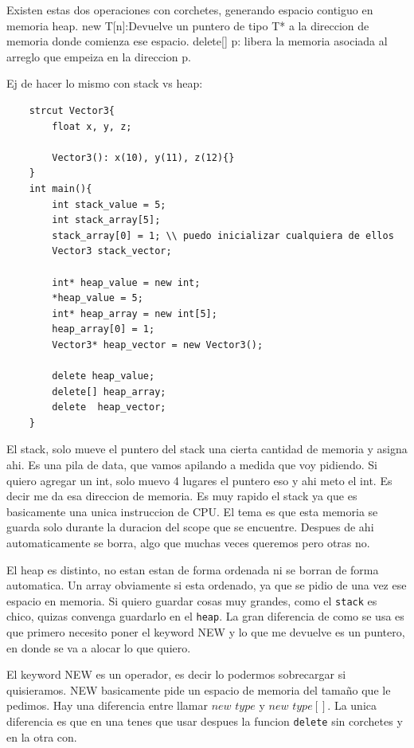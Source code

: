 \documentclass[11pt]{article}
\begin{document}
Existen estas dos operaciones con corchetes, generando espacio contiguo en memoria heap.
new T[n]:Devuelve un puntero de tipo T* a la direccion de memoria donde comienza ese espacio.
delete[] p: libera la memoria asociada al arreglo que empeiza en la  direccion p.

Ej de hacer lo mismo con stack vs heap:
\begin{lstlisting}
    strcut Vector3{
        float x, y, z;

        Vector3(): x(10), y(11), z(12){}
    }
    int main(){
        int stack_value = 5;
        int stack_array[5];
        stack_array[0] = 1; \\ puedo inicializar cualquiera de ellos
        Vector3 stack_vector;

        int* heap_value = new int;
        *heap_value = 5;
        int* heap_array = new int[5];
        heap_array[0] = 1;
        Vector3* heap_vector = new Vector3();

        delete heap_value;
        delete[] heap_array;
        delete  heap_vector;
    }
\end{lstlisting}

El stack, solo mueve el puntero del stack una cierta cantidad de memoria y
asigna ahi.
Es una pila de data, que vamos apilando a medida que voy pidiendo.
Si quiero agregar un int, solo muevo 4 lugares el puntero eso y ahi meto el int.
Es decir me da esa direccion de memoria.
Es muy rapido el stack ya que es basicamente una unica instruccion de CPU.
El tema es que esta memoria se guarda solo durante la duracion del scope que se
encuentre.
Despues de ahi automaticamente se borra, algo que muchas veces queremos
pero otras no.

El heap es distinto, no estan estan de forma ordenada ni se borran de forma
automatica.
Un array obviamente si esta ordenado, ya que se pidio de una vez ese espacio en memoria.
Si quiero guardar cosas muy grandes, como el \texttt{stack} es chico, quizas
convenga guardarlo en el \texttt{heap}.
La gran diferencia de como se usa es que primero necesito poner el keyword NEW
y lo que me devuelve es un puntero, en donde se va a alocar lo que quiero.

El keyword NEW es un operador, es decir lo podermos sobrecargar si quisieramos.
NEW basicamente pide un espacio de memoria del tama\~no que le pedimos.
Hay una diferencia entre llamar $new$ $type$ y $new$ $type[]$.
La unica diferencia es que en una tenes que usar despues la funcion \texttt{delete}
sin corchetes y en la otra con.
\end{document}
